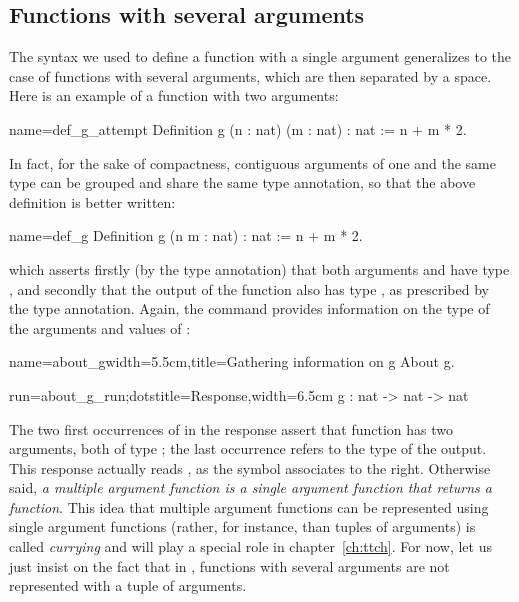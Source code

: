 
\subsection{Functions with several arguments}
\label{sec:fun-sev-args}
The syntax we used to define a function with a single argument
generalizes to the case of functions with several arguments, which are
then separated by a space. Here is an example of a function with two
arguments:

\begin{coq}{name=def_g_attempt}{}
Definition g (n : nat) (m : nat) : nat := n + m * 2.
\end{coq}
In fact, for the sake of compactness, contiguous arguments of one and
the same
type can be grouped and share the same type annotation, so that the
above definition is better written:

\begin{coq}{name=def_g}{}
Definition g (n m : nat) : nat := n + m * 2.
\end{coq}
which asserts firstly
(by the  type annotation)
that both arguments  and  have type ,
and secondly that the
output of the function also has type , as prescribed by the
 type annotation. Again, the   command
provides information on the type of the arguments and values of
:

\begin{coq}{name=about_g}{width=5.5cm,title=Gathering information on g}
About g.
\end{coq}
\begin{coqout}{run=about_g_run;dots}{title=Response,width=6.5cm}
g : nat -> nat -> nat
\end{coqout}

The two first occurrences of  in the response
  assert that function  has two arguments,
 both of type ; the last occurrence refers to the type of
 the output. This response actually reads ,
 as the \C{->} symbol associates to the right. Otherwise said,
 {\em a multiple
 argument function is a single argument function that returns a
 function}.  This idea that multiple argument functions can be
represented using single argument functions (rather, for instance, than
tuples of arguments) is called {\em currying} and will play a special
role in chapter~\ref{ch:ttch}. For now, let us just insist on the fact
that in \Coq{}, functions with several arguments are not represented
with a tuple of arguments.


